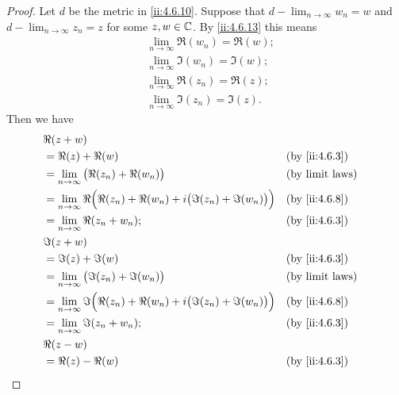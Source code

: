 \begin{proof}
  Let \(d\) be the metric in \cref{ii:4.6.10}.
  Suppose that \(d - \lim_{n \to \infty} w_n = w\) and \(d - \lim_{n \to \infty} z_n = z\) for some \(z, w \in \mathbb{C}\).
  By \cref{ii:4.6.13} this means
  \begin{align*}
     & \lim_{n \to \infty} \Re(w_n) = \Re(w); \\
     & \lim_{n \to \infty} \Im(w_n) = \Im(w); \\
     & \lim_{n \to \infty} \Re(z_n) = \Re(z); \\
     & \lim_{n \to \infty} \Im(z_n) = \Im(z).
  \end{align*}
  Then we have
  \begin{align*}
     & \Re(z + w)                                                                                                           \\
     & = \Re(z) + \Re(w)                                                                        &  & \by{ii:4.6.3}          \\
     & = \lim_{n \to \infty} \big(\Re(z_n) + \Re(w_n)\big)                                      &  & \text{(by limit laws)} \\
     & = \lim_{n \to \infty} \Re\Big(\Re(z_n) + \Re(w_n) + i \big(\Im(z_n) + \Im(w_n)\big)\Big) &  & \by{ii:4.6.8}          \\
     & = \lim_{n \to \infty} \Re(z_n + w_n);                                                    &  & \by{ii:4.6.3}          \\
     & \Im(z + w)                                                                                                           \\
     & = \Im(z) + \Im(w)                                                                        &  & \by{ii:4.6.3}          \\
     & = \lim_{n \to \infty} \big(\Im(z_n) + \Im(w_n)\big)                                      &  & \text{(by limit laws)} \\
     & = \lim_{n \to \infty} \Im\Big(\Re(z_n) + \Re(w_n) + i \big(\Im(z_n) + \Im(w_n)\big)\Big) &  & \by{ii:4.6.8}          \\
     & = \lim_{n \to \infty} \Im(z_n + w_n);                                                    &  & \by{ii:4.6.3}          \\
     & \Re(z - w)                                                                                                           \\
     & = \Re(z) - \Re(w)                                                                        &  & \by{ii:4.6.3}          \\

\end{align*}
\end{proof}
